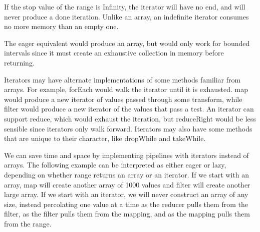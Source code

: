 If the stop value of the range is Infinity, the iterator will have no end, and will never produce a done iteration. Unlike an array, an indefinite iterator consumes no more memory than an empty one.


The eager equivalent would produce an array, but would only work for bounded intervals since it must create an exhaustive collection in memory before returning.



Iterators may have alternate implementations of some methods familiar from arrays. For example, forEach would walk the iterator until it is exhausted. map would produce a new iterator of values passed through some transform, while filter would produce a new iterator of the values that pass a test. An iterator can support reduce, which would exhaust the iteration, but reduceRight would be less sensible since iterators only walk forward. Iterators may also have some methods that are unique to their character, like dropWhile and takeWhile.

We can save time and space by implementing pipelines with iterators instead of arrays. The following example can be interpreted as either eager or lazy, depending on whether range returns an array or an iterator. If we start with an array, map will create another array of 1000 values and filter will create another large array. If we start with an iterator, we will never construct an array of any size, instead percolating one value at a time as the reducer pulls them from the filter, as the filter pulls them from the mapping, and as the mapping pulls them from the range.


